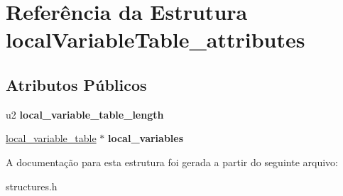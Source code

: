 \hypertarget{structlocalVariableTable__attributes}{}\section{Referência da Estrutura local\+Variable\+Table\+\_\+attributes}
\label{structlocalVariableTable__attributes}
\subsection*{Atributos Públicos}
\begin{DoxyCompactItemize}
\item 
\mbox{\label{structlocalVariableTable__attributes_a3ae381679f6b069984bfec2618cc40e4}} 
u2 {\bfseries local\+\_\+variable\+\_\+table\+\_\+length}
\item 
\mbox{\label{structlocalVariableTable__attributes_a78911369e8a4c58d93f579613144a8c2}} 
\hyperlink{structlocal__variable__table}{local\+\_\+variable\+\_\+table} $\ast$ {\bfseries local\+\_\+variables}
\end{DoxyCompactItemize}


A documentação para esta estrutura foi gerada a partir do seguinte arquivo\+:\begin{DoxyCompactItemize}
\item 
structures.\+h\end{DoxyCompactItemize}
